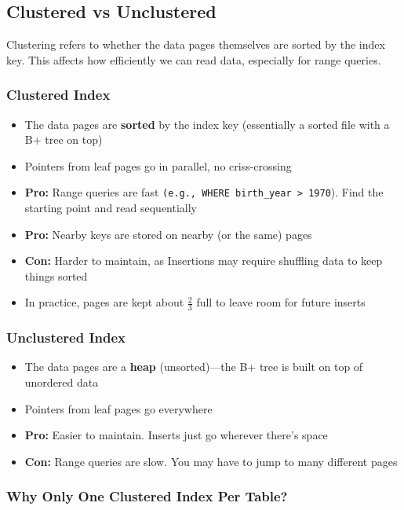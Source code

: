 \subsection{Clustered vs Unclustered}

Clustering refers to whether the data pages themselves are sorted by the index key. This affects how efficiently we can read data, especially for range queries.

\subsubsection*{Clustered Index}
\begin{itemize}
    \item The data pages are \textbf{sorted} by the index key (essentially a sorted file with a B+ tree on top)
    \item Pointers from leaf pages go in parallel, no criss-crossing
    \item \textbf{Pro:} Range queries are fast \texttt{(e.g., WHERE birth\_year > 1970}). Find the starting point and read sequentially 
    \item \textbf{Pro:} Nearby keys are stored on nearby (or the same) pages
    \item \textbf{Con:} Harder to maintain, as Insertions may require shuffling data to keep things sorted
    \item In practice, pages are kept about $\frac{2}{3}$ full to leave room for future inserts
\end{itemize}

\subsubsection*{Unclustered Index}
\begin{itemize}
    \item The data pages are a \textbf{heap} (unsorted)---the B+ tree is built on top of unordered data
    \item Pointers from leaf pages go everywhere
    \item \textbf{Pro:} Easier to maintain. Inserts just go wherever there's space
    \item \textbf{Con:} Range queries are slow. You may have to jump to many different pages
\end{itemize}

\subsubsection*{Why Only One Clustered Index Per Table?}


